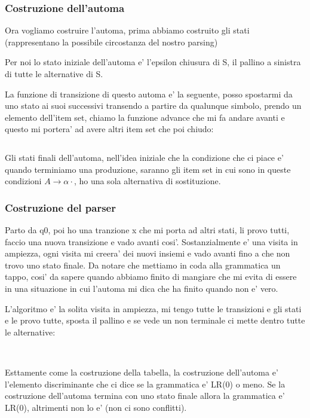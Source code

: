 \subsubsection{Costruzione dell'automa}
Ora vogliamo costruire l'automa, prima abbiamo costruito gli stati (rappresentano la possibile circostanza del nostro parsing)

Per noi lo stato iniziale dell'automa e' l'epsilon chiusura di S, il pallino a sinistra di tutte le alternative di S.

La funzione di transizione di questo automa e' la seguente, posso spostarmi da uno stato ai suoi successivi transendo a partire da qualunque simbolo, prendo un elemento dell'item set, chiamo la funzione advance che mi fa andare avanti e questo mi portera' ad avere altri item set che poi chiudo:
\begin{lstlisting}

\end{lstlisting}

Gli stati finali dell'automa, nell'idea iniziale che la condizione che ci piace e' quando terminiamo una produzione, saranno gli item set in cui sono in queste condizioni $A \rightarrow \alpha \cdot$, ho una sola alternativa di sostituzione.

\subsubsection{Costruzione del parser}
Parto da q0, poi ho una tranzione x che mi porta ad altri stati, li provo tutti, faccio una nuova transizione e vado avanti cosi'. Sostanzialmente e' una visita in ampiezza, ogni visita mi creera' dei nuovi insiemi e vado avanti fino a che non trovo uno stato finale.
Da notare che mettiamo in coda alla grammatica un tappo, cosi' da sapere quando abbiamo finito di mangiare che mi evita di essere in una situazione in cui l'automa mi dica che ha finito quando non e' vero.

L'algoritmo e' la solita visita in ampiezza, mi tengo tutte le transizioni e gli stati e le provo tutte, sposta il pallino e se vede un non terminale ci mette dentro tutte le alternative:
\begin{lstlisting}
  
\end{lstlisting}

Esttamente come la costruzione della tabella, la costruzione dell'automa e' l'elemento discriminante che ci dice se la grammatica e' LR(0) o meno. Se la costruzione dell'automa termina con uno stato finale allora la grammatica e' LR(0), altrimenti non lo e' (non ci sono conflitti).

